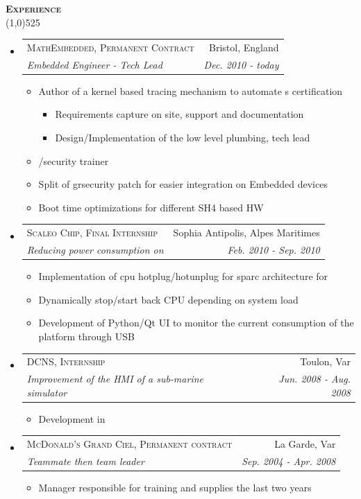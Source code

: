 \documentclass[letterpaper,11pt]{article}
\makeatletter
\newcommand{\resitem}[1]{\item #1}
\newcommand{\titlecolor}[0]{RoyalBlue4}
\newcommand{\bulletcolor}[0]{darkgray}
\newcommand{\resheading}[1]{
  \vspace{10pt}
  {\Large
        \textsc{\textcolor{\titlecolor}{\textbf{#1}}}
  } \\
  \vspace{-10.5pt}
  \hspace{-1pt}\textcolor{\titlecolor}{\line(1,0){525}}
}
\newcommand{\ressubheading}[4]{
  \vspace{8pt}
  \begin{tabular*}{7.0in}{l@{\extracolsep{\fill}}r}
    \textsc{#1} & #2 \\
    \textsl{#3} & \textit{#4} \\
  \end{tabular*}
}
\newcommand{\prettylist}[0]{
  \begin{itemize}
    \renewcommand{\labelitemi}{{\tiny \textcolor{\bulletcolor}{$\bullet$}}}
    \renewcommand{\labelitemiii}{$\cdot$}
}
\newcommand{\acro}[1]{
  \hspace{-3pt}{\small\textsc{#1}}\hspace{-3pt}
}
\makeatother
\begin{document}
\resheading{Experience}
\prettylist
\item
  \ressubheading{MathEmbedded, Permanent Contract}{Bristol, England}{Embedded
    Engineer - Tech Lead}{Dec. 2010 - today}
  \begin{itemize}
    \resitem{Author of a kernel based tracing mechanism to automate \acro{STB}s certification}
    \begin{itemize}
      \resitem{Requirements capture on site, support and documentation}
      \resitem{Design/Implementation of the low level plumbing, tech lead}
    \end{itemize}
    \resitem{\acro{Linux}/security trainer}
    \resitem{Split of grsecurity patch for easier integration on Embedded devices}
    \resitem{Boot time optimizations for different SH4 based HW}
  \end{itemize}
\item
  \ressubheading{Scaleo Chip, Final Internship}{Sophia Antipolis, Alpes Maritimes}{Reducing power consumption on \acro{Linux-SMP SoC}}{Feb. 2010 - Sep. 2010}
  \begin{itemize}
    \resitem{Implementation of cpu hotplug/hotunplug for sparc architecture for \acro{Linux}} 
    \resitem{Dynamically stop/start back CPU depending on system load}
    \resitem{Development of Python/Qt UI to monitor the current consumption of the platform through USB}
  \end{itemize}
\item
  \ressubheading{DCNS, Internship}{Toulon, Var}{Improvement of the HMI of a sub-marine simulator}{Jun. 2008 - Aug. 2008}
  \begin{itemize}
    \resitem Development in\acro{OpenMotif/C}
  \end{itemize}
\item
  \ressubheading{McDonald's Grand Ciel, Permanent contract}{La Garde,
    Var}{Teammate then team leader}{Sep. 2004 - Apr. 2008}
  \begin{itemize}
    \resitem Manager responsible for training and supplies the last two years
  \end{itemize}
\end{itemize}
\end{document}
